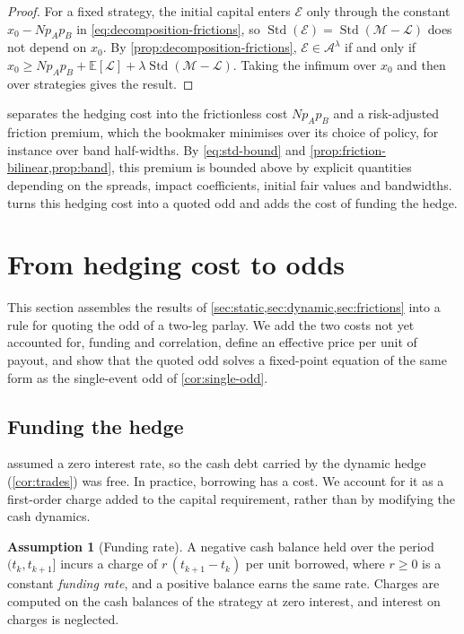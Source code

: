 \documentclass[11pt,a4paper]{article}
\theoremstyle{plain}
\theoremstyle{definition}
\newtheorem{assumption}[theorem]{Assumption}
\theoremstyle{remark}
\newcommand{\E}{\mathbb{E}}
\newcommand{\1}{\mathbf{1}}
\begin{document}
\begin{proof}
For a fixed strategy, the initial capital enters $\mathcal{E}$ only through the constant $x_0 - Np_Ap_B$ in \eqref{eq:decomposition-frictions}, so $\operatorname{Std}(\mathcal{E}) = \operatorname{Std}(\mathcal{M}-\mathcal{L})$ does not depend on $x_0$. By \cref{prop:decomposition-frictions}, $\mathcal{E}\in\mathcal{A}^\lambda$ if and only if $x_0\geq Np_Ap_B + \E[\mathcal{L}] + \lambda\operatorname{Std}(\mathcal{M}-\mathcal{L})$. Taking the infimum over $x_0$ and then over strategies gives the result.
\end{proof}

 separates the hedging cost into the frictionless cost $Np_Ap_B$ and a risk-adjusted friction premium, which the bookmaker minimises over its choice of policy, for instance over band half-widths. By \eqref{eq:std-bound} and \cref{prop:friction-bilinear,prop:band}, this premium is bounded above by explicit quantities depending on the spreads, impact coefficients, initial fair values and bandwidths.  turns this hedging cost into a quoted odd and adds the cost of funding the hedge.

\section{From hedging cost to odds}
\label{sec:odds}
This section assembles the results of \cref{sec:static,sec:dynamic,sec:frictions} into a rule for quoting the odd of a two-leg parlay. We add the two costs not yet accounted for, funding and correlation, define an effective price per unit of payout, and show that the quoted odd solves a fixed-point equation of the same form as the single-event odd of \cref{cor:single-odd}.

\subsection{Funding the hedge}

 assumed a zero interest rate, so the cash debt carried by the dynamic hedge (\cref{cor:trades}) was free. In practice, borrowing has a cost. We account for it as a first-order charge added to the capital requirement, rather than by modifying the cash dynamics.

\begin{assumption}[Funding rate]
\label{ass:funding}
A negative cash balance held over the period $(t_k,t_{k+1}]$ incurs a charge of $r\,(t_{k+1}-t_k)$ per unit borrowed, where $r\geq 0$ is a constant \emph{funding rate}, and a positive balance earns the same rate. Charges are computed on the cash balances of the strategy at zero interest, and interest on charges is neglected.
\end{assumption}
\end{document}
